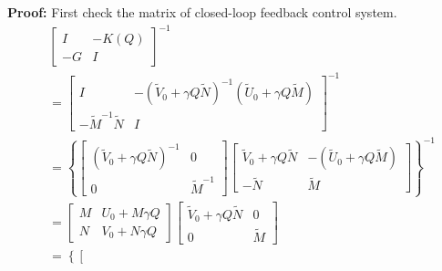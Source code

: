 \documentclass[journal]{IEEEtran}
\begin{document}
\textbf{Proof:} First check the matrix of closed-loop feedback control system.
\begin{equation}
  \begin{aligned}
     & \left[\begin{array}{cc}
        I  & -K(Q) \\
        -G & I
      \end{array}\right]^{-1}                                                                                                                                                              \\
     & =\left[\begin{array}{cc}
        I                         & -(\tilde{V}_{0}+\gamma Q \tilde{N})^{-1} (\tilde{U}_{0}+\gamma Q \tilde{M}) \\
        -\tilde{M}^{-1} \tilde{N} & I
      \end{array}\right]^{-1}                                                                                                                                                             \\
     & =\left\{\left[\begin{array}{cc}
        (\tilde{V}_{0}+\gamma Q \tilde{N})^{-1} & 0              \\
        0                                       & \tilde{M}^{-1}
      \end{array}\right]\left[\begin{array}{cc}
        \tilde{V}_{0}+\gamma Q \tilde{N} & -(\tilde{U}_{0}+\gamma Q \tilde{M}) \\
        -\tilde{N}                       & \tilde{M}
      \end{array}\right]\right\}^{-1}                                                                                                   \\
     & =\left[\begin{array}{cc}
        M & U_{0}+M \gamma Q \\
        N & V_{0}+N \gamma Q
      \end{array}\right]\left[\begin{array}{cc}
        \tilde{V}_{0}+\gamma Q \tilde{N} & 0         \\
        0                                & \tilde{M}
      \end{array}\right]                                                                                                                       \\
     & =\left\{\left[\begin{array}{ll}

\end{array}
\end{aligned}
\end{equation}
\end{document}
